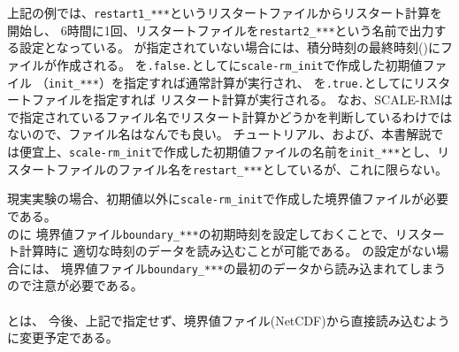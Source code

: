 上記の例では、\verb|restart1_***|というリスタートファイルからリスタート計算を開始し、
6時間に1回、リスタートファイルを\verb|restart2_***|という名前で出力する設定となっている。
が指定されていない場合には、積分時刻の最終時刻()にファイルが作成される。
を\verb|.false.|としてに\verb|scale-rm_init|で作成した初期値ファイル
（\verb|init_***|）を指定すれば通常計算が実行され、
を\verb|.true.|としてにリスタートファイルを指定すれば
リスタート計算が実行される。
なお、SCALE-RMはで指定されているファイル名でリスタート計算かどうかを判断しているわけではないので、ファイル名はなんでも良い。
チュートリアル、および、本書解説では便宜上、\verb|scale-rm_init|で作成した初期値ファイルの名前を\verb|init_***|とし、リスタートファイルのファイル名を\verb|restart_***|としているが、これに限らない。


現実実験の場合、初期値以外に\verb|scale-rm_init|で作成した境界値ファイルが必要である。\\
のに
境界値ファイル\verb|boundary_***|の初期時刻を設定しておくことで、リスタート計算時に
適切な時刻のデータを読み込むことが可能である。
の設定がない場合には、
境界値ファイル\verb|boundary_***|の最初のデータから読み込まれてしまうので注意が必要である。\\

\\

とは、
今後、上記で指定せず、境界値ファイル(NetCDF)から直接読み込むように変更予定である。

